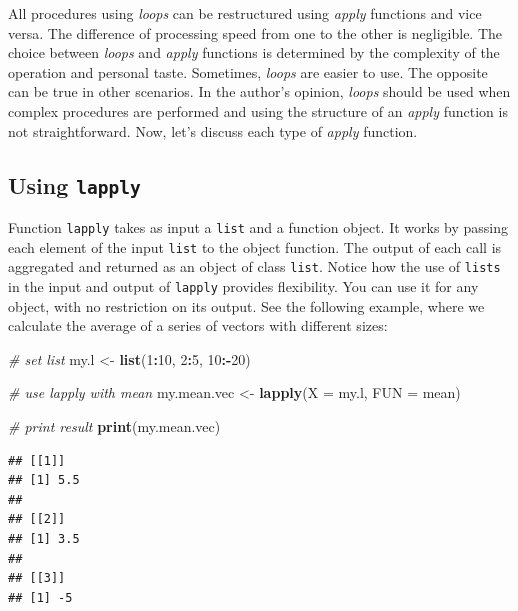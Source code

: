 \documentclass[11pt,]{book}
\newenvironment{Shaded}{\begin{snugshade}}{\end{snugshade}}
\newcommand{\KeywordTok}[1]{\textcolor[rgb]{0.27,0.27,0.27}{\textbf{#1}}}
\newcommand{\DataTypeTok}[1]{\textcolor[rgb]{0.27,0.27,0.27}{#1}}
\newcommand{\DecValTok}[1]{\textcolor[rgb]{0.06,0.06,0.06}{#1}}
\newcommand{\StringTok}[1]{\textcolor[rgb]{0.5,0.5,0.5}{#1}}
\newcommand{\CommentTok}[1]{\textcolor[rgb]{0.56,0.35,0.01}{\textit{#1}}}
\newcommand{\OperatorTok}[1]{\textcolor[rgb]{0.81,0.36,0.00}{\textbf{#1}}}
\newcommand{\NormalTok}[1]{#1}
\begin{document}
All procedures using \emph{loops} can be restructured using \emph{apply}
functions and vice versa. The difference of processing speed from one to
the other is negligible. The choice between \emph{loops} and
\emph{apply} functions is determined by the complexity of the operation
and personal taste. Sometimes, \emph{loops} are easier to use. The
opposite can be true in other scenarios. In the author's opinion,
\emph{loops} should be used when complex procedures are performed and
using the structure of an \emph{apply} function is not straightforward.
Now, let's discuss each type of \emph{apply} function.

\subsection{\texorpdfstring{Using
\texttt{lapply}}{Using lapply}}\label{using-lapply}

Function \texttt{lapply} takes as input a \texttt{list} and a function
object. It works by passing each element of the input \texttt{list} to
the object function. The output of each call is aggregated and returned
as an object of class \texttt{list}. Notice how the use of
\texttt{lists} in the input and output of \texttt{lapply} provides
flexibility. You can use it for any object, with no restriction on its
output. See the following example, where we calculate the average of a
series of vectors with different sizes: 

\begin{Shaded}
\begin{Highlighting}[]
\CommentTok{# set list}
\NormalTok{my.l <-}\StringTok{ }\KeywordTok{list}\NormalTok{(}\DecValTok{1}\OperatorTok{:}\DecValTok{10}\NormalTok{, }\DecValTok{2}\OperatorTok{:}\DecValTok{5}\NormalTok{, }\DecValTok{10}\OperatorTok{:-}\DecValTok{20}\NormalTok{)}

\CommentTok{# use lapply with mean}
\NormalTok{my.mean.vec <-}\StringTok{ }\KeywordTok{lapply}\NormalTok{(}\DataTypeTok{X =}\NormalTok{ my.l, }\DataTypeTok{FUN =}\NormalTok{ mean)}

\CommentTok{# print result}
\KeywordTok{print}\NormalTok{(my.mean.vec)}
\end{Highlighting}
\end{Shaded}

\begin{verbatim}
## [[1]]
## [1] 5.5
## 
## [[2]]
## [1] 3.5
## 
## [[3]]
## [1] -5
\end{verbatim}
\end{document}
